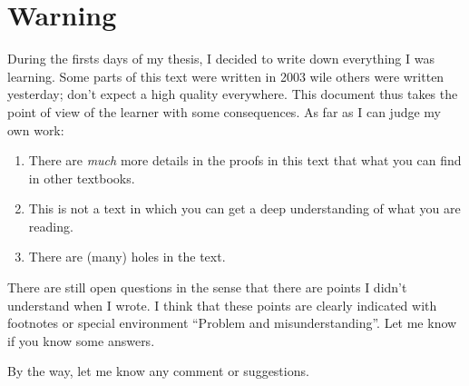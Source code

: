 \section{Warning}

During the firsts days of my thesis, I decided to write down everything I was learning. Some parts of this text were written in 2003 wile others were written yesterday; don't expect a high quality everywhere. This document thus takes the point of view of the learner with some consequences. As far as I can judge my own work:
\begin{enumerate}
    \item
        There are \emph{much} more details in the proofs in this text that what you can find in other textbooks.
    \item
        This is not a text in which you can get a deep understanding of what you are reading.
    \item
        There are (many) holes in the text.
\end{enumerate}

There are still open questions in the sense that there are points I didn't understand when I wrote. I think that these points are clearly indicated with footnotes or special environment ``Problem and misunderstanding''. Let me know if you know some answers.

By the way, let me know any comment or suggestions.
